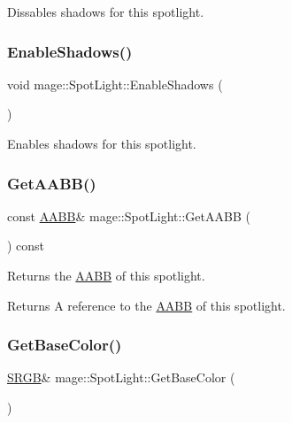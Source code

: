 Dissables shadows for this spotlight. \hypertarget{classmage_1_1_spot_light_a51694c316560929e6ae49c019d3dc763}{}\label{classmage_1_1_spot_light_a51694c316560929e6ae49c019d3dc763} 
\subsubsection{\texorpdfstring{Enable\+Shadows()}{EnableShadows()}}
{\footnotesize\ttfamily void mage\+::\+Spot\+Light\+::\+Enable\+Shadows (\begin{DoxyParamCaption}{ }\end{DoxyParamCaption})\hspace{0.3cm}{\ttfamily [noexcept]}}

Enables shadows for this spotlight. \hypertarget{classmage_1_1_spot_light_add184856d7fdb2ff9ae16221d9493bf5}{}\label{classmage_1_1_spot_light_add184856d7fdb2ff9ae16221d9493bf5} 
\subsubsection{\texorpdfstring{Get\+A\+A\+B\+B()}{GetAABB()}}
{\footnotesize\ttfamily const \hyperlink{classmage_1_1_a_a_b_b}{A\+A\+BB}\& mage\+::\+Spot\+Light\+::\+Get\+A\+A\+BB (\begin{DoxyParamCaption}{ }\end{DoxyParamCaption}) const\hspace{0.3cm}{\ttfamily [noexcept]}}

Returns the \hyperlink{classmage_1_1_a_a_b_b}{A\+A\+BB} of this spotlight.

\begin{DoxyReturn}{Returns}
A reference to the \hyperlink{classmage_1_1_a_a_b_b}{A\+A\+BB} of this spotlight. 
\end{DoxyReturn}
\hypertarget{classmage_1_1_spot_light_ad1345ae07a114dc8d4b6a00d08b4230a}{}\label{classmage_1_1_spot_light_ad1345ae07a114dc8d4b6a00d08b4230a} 
\subsubsection{\texorpdfstring{Get\+Base\+Color()}{GetBaseColor()}\hspace{0.1cm}{\footnotesize\ttfamily [1/2]}}
{\footnotesize\ttfamily \hyperlink{structmage_1_1_s_r_g_b}{S\+R\+GB}\& mage\+::\+Spot\+Light\+::\+Get\+Base\+Color (\begin{DoxyParamCaption}{ }\end{DoxyParamCaption})\hspace{0.3cm}{\ttfamily [noexcept]}}

